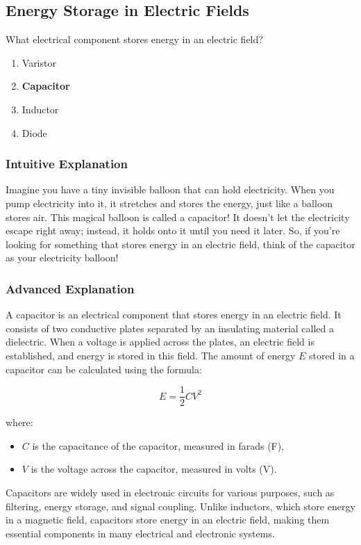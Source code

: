 \subsection{Energy Storage in Electric Fields}
\label{T6A04}

\begin{tcolorbox}[colback=gray!10!white,colframe=black!75!black,title=T6A04]
What electrical component stores energy in an electric field?
\begin{enumerate}[label=\Alph*)]
    \item Varistor
    \item \textbf{Capacitor}
    \item Inductor
    \item Diode
\end{enumerate}
\end{tcolorbox}

\subsubsection{Intuitive Explanation}
Imagine you have a tiny invisible balloon that can hold electricity. When you pump electricity into it, it stretches and stores the energy, just like a balloon stores air. This magical balloon is called a capacitor! It doesn’t let the electricity escape right away; instead, it holds onto it until you need it later. So, if you’re looking for something that stores energy in an electric field, think of the capacitor as your electricity balloon!

\subsubsection{Advanced Explanation}
A capacitor is an electrical component that stores energy in an electric field. It consists of two conductive plates separated by an insulating material called a dielectric. When a voltage is applied across the plates, an electric field is established, and energy is stored in this field. The amount of energy \( E \) stored in a capacitor can be calculated using the formula:

\[
E = \frac{1}{2} C V^2
\]

where:
\begin{itemize}
    \item \( C \) is the capacitance of the capacitor, measured in farads (F),
    \item \( V \) is the voltage across the capacitor, measured in volts (V).
\end{itemize}

Capacitors are widely used in electronic circuits for various purposes, such as filtering, energy storage, and signal coupling. Unlike inductors, which store energy in a magnetic field, capacitors store energy in an electric field, making them essential components in many electrical and electronic systems.

